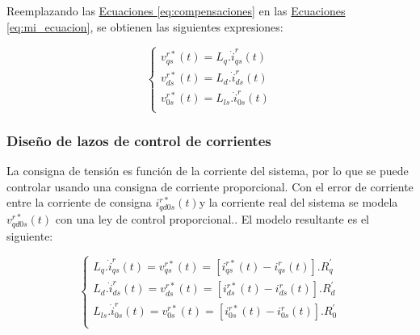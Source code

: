 \documentclass{article}
\begin{document}
Reemplazando las \hyperref[eq:compensaciones]{Ecuaciones \ref*{eq:compensaciones}} en las
\hyperref[eq:mi_ecuacion]{Ecuaciones \ref*{eq:mi_ecuacion}}, se obtienen las siguientes expresiones:

\begin{equation}\label{eq:proporcionlaidad_corrientes_tensiones_de_entrada}
    \begin{cases}
        v^{r*}_{qs}(t) = L_q. \dot{i}_{qs}^r(t) \\
        v^{r*}_{ds}(t) = L_d. \dot{i}_{ds}^r(t) \\
        v^{r*}_{0s}(t) = L_{ls}. \dot{i}_{0s}^r(t) \\
    \end{cases}
\end{equation}




\subsubsection*{Diseño de lazos de control de corrientes}

La consigna de tensión es función de la corriente del sistema, por lo que se puede controlar usando 
una consigna de corriente proporcional. Con el error de corriente entre la corriente de consigna 
$i_{qd0s}^{r*}(t)$y la corriente real del sistema se modela $v_{qd0s}^{r*}(t)$ con una ley de 
control proporcional.. El modelo resultante es el siguiente:

\begin{equation}
    \begin{cases}
        L_q. \dot{i}_{qs}^r(t) = v^{r*}_{qs}(t) = [i_{qs}^{r*}(t) - i_{qs}^r(t)].R_q^\prime \\
        L_d. \dot{i}_{ds}^r(t) = v^{r*}_{ds}(t) = [i_{ds}^{r*}(t) - i_{ds}^r(t)].R_d^\prime \\
        L_{ls}. \dot{i}_{0s}^r(t) = v^{r*}_{0s}(t) = [i_{0s}^{r*}(t) - i_{0s}^r(t)].R_{0}^\prime \\
    \end{cases}
\end{equation}
\end{document}
